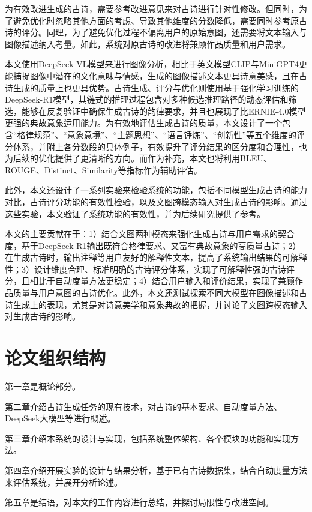 为有效改进生成的古诗，需要参考改进意见来对古诗进行针对性修改。但同时，为了避免优化时忽略其他方面的考虑、导致其他维度的分数降低，需要同时参考原古诗的评分。同理，为了避免优化过程不偏离用户的原始意图，还需要将文本输入与图像描述纳入考量。如此，系统对原古诗的改进将兼顾作品质量和用户需求。

本文使用DeepSeek-VL模型来进行图像分析，相比于英文模型CLIP与MiniGPT4更能捕捉图像中潜在的文化意味与情感，生成的图像描述文本更具诗意美感，且在古诗生成的质量上也更具优势。古诗生成、评分与优化则使用基于强化学习训练的DeepSeek-R1模型，其链式的推理过程包含对多种候选推理路径的动态评估和筛选，能够在反复验证中确保生成古诗的韵律要求，并且也展现了比ERNIE-4.0模型更强的典故意象运用能力。为有效地评估生成古诗的质量，本文设计了一个包含“格律规范”、“意象意境”、“主题思想”、“语言锤炼”、“创新性”等五个维度的评分体系，并附上各分数段的具体例子，有效提升了评分结果的区分度和合理性，也为后续的优化提供了更清晰的方向。而作为补充，本文也将利用BLEU、ROUGE、Distinct、Similarity等指标作为辅助评估。

此外，本文还设计了一系列实验来检验系统的功能，包括不同模型生成古诗的能力对比，古诗评分功能的有效性检验，以及文图跨模态输入对生成古诗的影响。通过这些实验，本文验证了系统功能的有效性，并为后续研究提供了参考。

本文的主要贡献在于：1）结合文图两种模态来强化生成古诗与用户需求的契合度，基于DeepSeek-R1输出既符合格律要求、又富有典故意象的高质量古诗；2）在生成古诗时，输出注释等用户友好的解释性文本，提高了系统输出结果的可解释性；3）设计维度合理、标准明确的古诗评分体系，实现了可解释性强的古诗评分，且相比于自动度量方法更稳定；4）结合用户输入和评价结果，实现了兼顾作品质量与用户意图的古诗优化。此外，本文还测试探索不同大模型在图像描述和古诗生成上的表现，尤其是对诗意美学和意象典故的把握，并讨论了文图跨模态输入对生成古诗的影响。

\section{论文组织结构}

    第一章是概论部分。
    
    第二章介绍古诗生成任务的现有技术，对古诗的基本要求、自动度量方法、DeepSeek大模型等进行概述。

    第三章介绍本系统的设计与实现，包括系统整体架构、各个模块的功能和实现方法。

    第四章介绍开展实验的设计与结果分析，基于已有古诗数据集，结合自动度量方法来评估系统，并展开分析论述。

    第五章是结语，对本文的工作内容进行总结，并探讨局限性与改进空间。
  